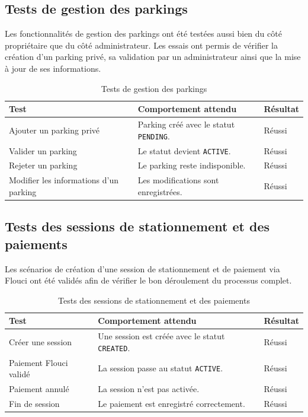\subsection{Tests de gestion des parkings}

\par Les fonctionnalités de gestion des parkings ont été testées aussi bien du côté propriétaire que du côté administrateur. Les essais ont permis de vérifier la création d'un parking privé, sa validation par un administrateur ainsi que la mise à jour de ses informations.

\begin{table}[H]
\centering
\small
\renewcommand{\arraystretch}{1.25}
\begin{tabular}{|p{}|p{}|p{}|}
\hline
\textbf{Test} & \textbf{Comportement attendu} & \textbf{Résultat} \\
\hline
Ajouter un parking privé & Parking créé avec le statut \texttt{PENDING}. & Réussi \\
\hline
Valider un parking & Le statut devient \texttt{ACTIVE}. & Réussi \\
\hline
Rejeter un parking & Le parking reste indisponible. & Réussi \\
\hline
Modifier les informations d'un parking & Les modifications sont enregistrées. & Réussi \\
\hline
\end{tabular}
\caption{Tests de gestion des parkings}
\label{tab:parking_tests}
\end{table}

\subsection{Tests des sessions de stationnement et des paiements}

\par Les scénarios de création d'une session de stationnement et de paiement via Flouci ont été validés afin de vérifier le bon déroulement du processus complet.

\begin{table}[H]
\centering
\small
\renewcommand{\arraystretch}{1.25}
\begin{tabular}{|p{}|p{}|p{}|}
\hline
\textbf{Test} & \textbf{Comportement attendu} & \textbf{Résultat} \\
\hline
Créer une session & Une session est créée avec le statut \texttt{CREATED}. & Réussi \\
\hline
Paiement Flouci validé & La session passe au statut \texttt{ACTIVE}. & Réussi \\
\hline
Paiement annulé & La session n'est pas activée. & Réussi \\
\hline
Fin de session & Le paiement est enregistré correctement. & Réussi \\
\hline
\end{tabular}
\caption{Tests des sessions de stationnement et des paiements}
\label{tab:session_tests}
\end{table}

